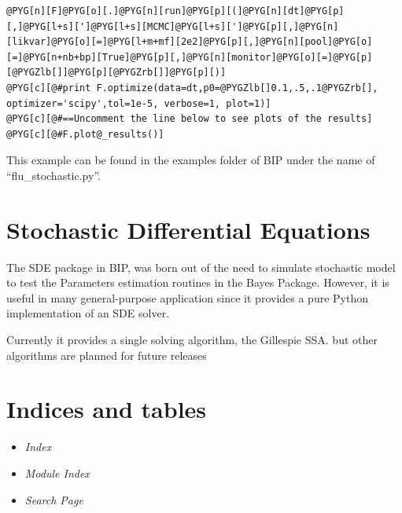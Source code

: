 \documentclass[a4paper,10pt,english]{manual}
\begin{document}
\begin{Verbatim}[commandchars=@\[\]]
@PYG[n][F]@PYG[o][.]@PYG[n][run]@PYG[p][(]@PYG[n][dt]@PYG[p][,]@PYG[l+s][']@PYG[l+s][MCMC]@PYG[l+s][']@PYG[p][,]@PYG[n][likvar]@PYG[o][=]@PYG[l+m+mf][2e2]@PYG[p][,]@PYG[n][pool]@PYG[o][=]@PYG[n+nb+bp][True]@PYG[p][,]@PYG[n][monitor]@PYG[o][=]@PYG[p][@PYGZlb[]]@PYG[p][@PYGZrb[]]@PYG[p][)]
@PYG[c][@#print F.optimize(data=dt,p0=@PYGZlb[]0.1,.5,.1@PYGZrb[], optimizer='scipy',tol=1e-5, verbose=1, plot=1)]
@PYG[c][@#==Uncomment the line below to see plots of the results]
@PYG[c][@#F.plot@_results()]
\end{Verbatim}

This example can be found in the examples folder of BIP under the name of ``flu\_stochastic.py''.

\resetcurrentobjects
\hypertarget{--doc-sde}{}

\hypertarget{sde}{}\chapter{Stochastic Differential Equations}

The SDE package in BIP, was born out of the need to simulate stochastic model to test the Parameters estimation routines in the Bayes Package. However, it is useful in many general-purpose application since it provides a pure Python implementation of an SDE solver.

Currently it provides a single solving algorithm, the Gillespie SSA. but other algorithms are planned for future releases


\chapter{Indices and tables}
\begin{itemize}
\item {} 
\emph{Index}

\item {} 
\emph{Module Index}

\item {} 
\emph{Search Page}

\end{itemize}


\renewcommand{\indexname}{Module Index}
\printmodindex
\renewcommand{\indexname}{Index}
\printindex
\end{document}
